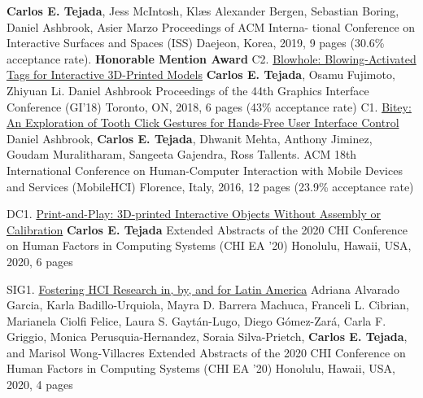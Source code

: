 \begin{cvpublications}
        {\textbf{Carlos E. Tejada}, Jess McIntosh, Klæs Alexander Bergen, Sebastian Boring, Daniel Ashbrook, Asier Marzo}%
        {Proceedings of ACM Interna- tional Conference on Interactive Surfaces and Spaces (ISS)}%
        {Daejeon, Korea, 2019, 9 pages (30.6\% acceptance rate). \bf Honorable Mention Award}
      \cvpublication%
        {C2.}%
        {\href{https://doi.org/10.20380/GI2018.18}{Blowhole: Blowing-Activated Tags for Interactive 3D-Printed Models}}%
        {\textbf{Carlos E. Tejada}, Osamu Fujimoto, Zhiyuan Li. Daniel Ashbrook}%
        {Proceedings of the 44th Graphics Interface Conference (GI’18)}%
        {Toronto, ON, 2018, 6 pages (43\% acceptance rate)}
      \cvpublication%
        {C1.}%
        {\href{https://doi.org/10.1145/2935334.2935389}{Bitey: An Exploration of Tooth Click Gestures for Hands-Free User Interface Control}}%
        {Daniel Ashbrook, \textbf{Carlos E. Tejada}, Dhwanit Mehta, Anthony Jiminez, Goudam Muralitharam, Sangeeta Gajendra, Ross Tallents.}%
        {ACM 18th International Conference on Human-Computer Interaction with Mobile Devices and Services (MobileHCI)}%
        {Florence, Italy, 2016, 12 pages (23.9\% acceptance rate)}
    \end{cvpublications}

    \begin{cvpublications}
      \cvpublication%
        {DC1.}%
        {\href{https://doi.org/10.1145/3334480.3375025}{Print-and-Play: 3D-printed Interactive Objects Without Assembly or Calibration}}%
        {\textbf{Carlos E. Tejada}}%
        {Extended Abstracts of the 2020 CHI Conference on Human Factors in Computing Systems (CHI EA ’20)}%
        {Honolulu, Hawaii, USA, 2020, 6 pages}
    \end{cvpublications}

    \begin{cvpublications}
      \cvpublication%
        {SIG1.}%
        {\href{https://doi.org/10.1145/3334480.3381055}{Fostering HCI Research in, by, and for Latin America}}%
        {Adriana Alvarado Garcia, Karla Badillo-Urquiola, Mayra D. Barrera Machuca, Franceli L. Cibrian, Marianela Ciolfi Felice, Laura S. Gaytán-Lugo, Diego Gómez-Zará, Carla F. Griggio, Monica Perusquia-Hernandez, Soraia Silva-Prietch, \textbf{Carlos E. Tejada}, and Marisol Wong-Villacres}%
        {Extended Abstracts of the 2020 CHI Conference on Human Factors in Computing Systems (CHI EA ’20)}%
        {Honolulu, Hawaii, USA, 2020, 4 pages}
    \end{cvpublications}
